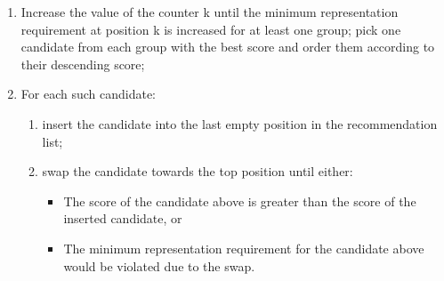 \begin{enumerate}
\item Increase the value of the counter k until the minimum representation requirement at position k is increased for at least one group; pick one candidate from each group with the best score and order them according to their descending score;
\item For each such candidate:
\begin{enumerate}
\item insert the candidate into the last empty position in the recommendation list;
\item swap the candidate towards the top position until either:
\begin{itemize}
\item The score of the candidate above is greater than the score of the inserted candidate, or
\item The minimum representation requirement for the candidate above would be violated due to the swap.
\end{itemize}
\end{enumerate}
\end{enumerate}

